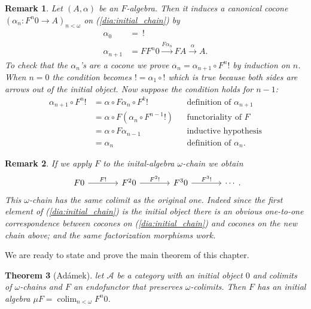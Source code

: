 \documentclass[letterpaper, 11pt, oneside]{memoir}
\theoremstyle{myteo}
\newtheorem{theorem}{Theorem}[section]
\newtheorem{remark}[theorem]{Remark}
\numberwithin{equation}{section}
\DeclareMathOperator*\colim{colim}
\newcommand{\A}{\mathscr{A}}
\begin{document}
\begin{remark}
  \label{rem:induced_cocone}
  Let \((A, \alpha)\) be an \(F\)-algebra.
  Then it induces a canonical cocone \((\alpha_n \colon F^n0 \to A)_{n < \omega}\) on (\ref{dia:initial_chain}) by
  \begin{align*}
    \alpha_0 &=\ ! \\
    \alpha_{n+1} &= FF^n0 \xrightarrow{F\alpha_n} FA \xrightarrow{\alpha} A.
  \end{align*}
  To check that the \(\alpha_n\)'s are a cocone we prove \(\alpha_n = \alpha_{n+1} \circ F^n!\) by induction on \(n\).
  When \(n = 0\) the condition becomes \(! = \alpha_1 \circ !\) which is true because both sides are arrows out of the initial object.
  Now suppose the condition holds for \(n - 1\):
  \begin{align*}
    \alpha_{n+1} \circ F^n! &= \alpha \circ F\alpha_n \circ F^k! && \text{definition of \(\alpha_{n+1}\)}\\
    &= \alpha \circ F(\alpha_n \circ F^{n-1}!) && \text{functoriality of \(F\)}\\
    &= \alpha \circ F\alpha_{n-1} && \text{inductive hypothesis}\\
    &= \alpha_n && \text{definition of \(\alpha_n\)}.
  \end{align*}
\end{remark}

\begin{remark}
  If we apply \(F\) to the inital-algebra \(\omega\)-chain we obtain
  \begin{equation}
    \label{dia:initial_chain_F}
    \begin{tikzcd}[sep = large]
      F0 \ar[r, "F!"] & F^20 \ar[r, "F^2!"] & F^30 \ar[r, "F^3!"] & \cdots
    \end{tikzcd}.
  \end{equation}
  This \(\omega\)-chain has the same colimit as the original one.
  Indeed since the first element of (\ref{dia:initial_chain}) is the initial object there is an obvious one-to-one correspondence between cocones on (\ref{dia:initial_chain}) and cocones on the new chain above; and the same factorization morphisms work.
\end{remark}

We are ready to state and prove the main theorem of this chapter.

\begin{theorem}[Adámek]
  \label{teo:adamek}
  let \(\A\) be a category with an initial object \(0\) and colimits of \(\omega\)-chains and \(F\) an endofunctor that preserves \(\omega\)-colimits.
  Then \(F\) has an initial algebra \(\mu F = \colim_{n < \omega}F^n0\).
\end{theorem}
\end{document}
